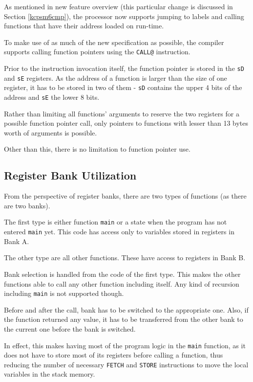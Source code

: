         As mentioned in new feature overview (this particular change is discussed in Section \ref{kcpsm6cmp}), the processor now supports jumping to labels and calling functions that have their address loaded on run-time.

        To make use of as much of the new specification as possible, the compiler supports calling function pointers using the \texttt{CALL@} instruction.

        Prior to the instruction invocation itself, the function pointer is stored in the \texttt{sD} and \texttt{sE} registers. As the address of a function is larger than the size of one register, it has to be stored in two of them - \texttt{sD} contains the upper 4 bits of the address and \texttt{sE} the lower 8 bits.

        Rather than limiting all functions' arguments to reserve the two registers for a possible function pointer call, only pointers to functions with lesser than 13 bytes worth of arguments is possible.

        Other than this, there is no limitation to function pointer use.

        \subsection{Register Bank Utilization}

        From the perspective of register banks, there are two types of functions (as there are two banks). 

        The first type is either function \texttt{main} or a state when the program has not entered \texttt{main} yet. This code has access only to variables stored in registers in Bank A.

        The other type are all other functions. These have access to registers in Bank B.

        Bank selection is handled from the code of the first type. This makes the other functions able to call any other function including itself. Any kind of recursion including \texttt{main} is not supported though.

        Before and after the call, bank has to be switched to the appropriate one. Also, if the function returned any value, it has to be transferred from the other bank to the current one before the bank is switched.

        In effect, this makes having most of the program logic in the \texttt{main} function, as it does not have to store most of its registers before calling a function, thus reducing the number of necessary \texttt{FETCH} and \texttt{STORE} instructions to move the local variables in the stack memory.

